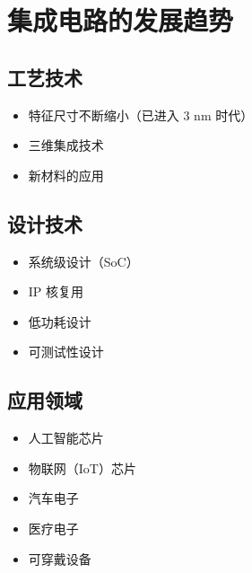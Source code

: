 \section{集成电路的发展趋势}

\subsection{工艺技术}

\begin{itemize}
  \item 特征尺寸不断缩小（已进入 3 nm 时代）
  \item 三维集成技术
  \item 新材料的应用
\end{itemize}

\subsection{设计技术}

\begin{itemize}
  \item 系统级设计（SoC）
  \item IP 核复用
  \item 低功耗设计
  \item 可测试性设计
\end{itemize}

\subsection{应用领域}

\begin{itemize}
  \item 人工智能芯片
  \item 物联网（IoT）芯片
  \item 汽车电子
  \item 医疗电子
  \item 可穿戴设备
\end{itemize}
